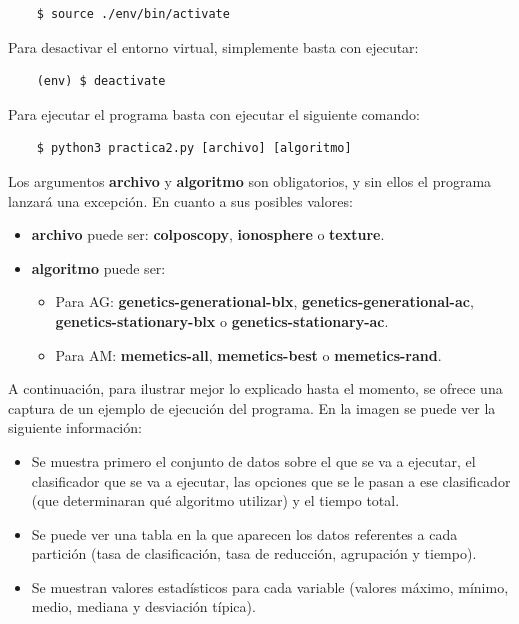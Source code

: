 \documentclass[11pt,a4paper]{article}
\begin{document}
\begin{lstlisting}
	$ source ./env/bin/activate
\end{lstlisting}

Para desactivar el entorno virtual, simplemente basta con ejecutar:

\begin{lstlisting}
	(env) $ deactivate
\end{lstlisting}

Para ejecutar el programa basta con ejecutar el siguiente comando:

\begin{lstlisting}
	$ python3 practica2.py [archivo] [algoritmo]
\end{lstlisting}

Los argumentos \textbf{archivo} y \textbf{algoritmo} son obligatorios, y sin ellos el programa lanzará una excepción. En
cuanto a sus posibles valores:

\begin{itemize}[label=\textbullet]
	\item \textbf{archivo} puede ser: \textbf{colposcopy}, \textbf{ionosphere} o \textbf{texture}.
	\item \textbf{algoritmo} puede ser:
	\begin{itemize}[label=$\ast$]
		\item Para AG: \textbf{genetics-generational-blx}, \textbf{genetics-generational-ac},\\
		\textbf{genetics-stationary-blx} o \textbf{genetics-stationary-ac}.
		\item Para AM: \textbf{memetics-all}, \textbf{memetics-best} o \textbf{memetics-rand}.
	\end{itemize}
\end{itemize}

A continuación, para ilustrar mejor lo explicado hasta el momento, se ofrece una captura de un ejemplo de ejecución del
programa. En la imagen se puede ver la siguiente información:

\begin{itemize}[label=\textbullet]
	\item Se muestra primero el conjunto de datos sobre el que se va a ejecutar, el clasificador que se va a ejecutar,
	las opciones que se le pasan a ese clasificador (que determinaran qué algoritmo utilizar) y el tiempo total.
	\item Se puede ver una tabla en la que aparecen los datos referentes a cada partición (tasa de clasificación, tasa de
	reducción, agrupación y tiempo).
	\item Se muestran valores estadísticos para cada variable (valores máximo, mínimo, medio, mediana y desviación típica).
\end{itemize}
\end{document}
